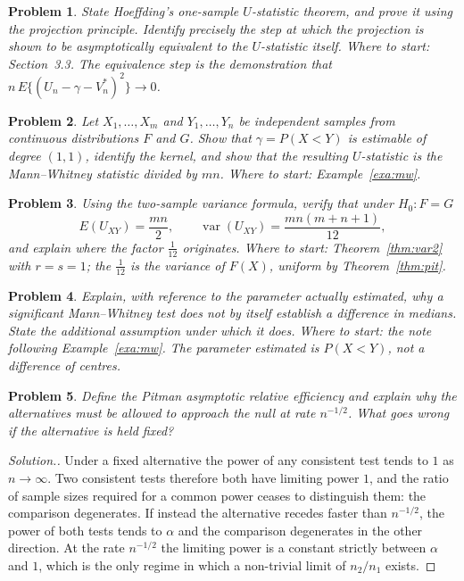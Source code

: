 \documentclass[12pt,a4paper]{report}
\theoremstyle{definition}
\theoremstyle{plain}
\newtheorem{problemx}{Problem}[section]
\newenvironment{problem}{\begin{problemx}}{\end{problemx}}
\newenvironment{solution}
  {\renewcommand{\qedsymbol}{}\begin{proof}[\textit{Solution}.]}
  {\end{proof}}
\begin{document}
\begin{problem}
State Hoeffding's one-sample $U$-statistic theorem, and prove it using the
projection principle. Identify precisely the step at which the projection is
shown to be asymptotically equivalent to the $U$-statistic itself.
\emph{Where to start: Section~3.3. The equivalence step is the demonstration that $n\,E\{(U_n-\gamma-V^*_n)^2\}\to 0$.}
\end{problem}

\begin{problem}
Let $X_1,\dots,X_m$ and $Y_1,\dots,Y_n$ be independent samples from continuous
distributions $F$ and $G$. Show that $\gamma = P(X<Y)$ is estimable of degree
$(1,1)$, identify the kernel, and show that the resulting $U$-statistic is the
Mann--Whitney statistic divided by $mn$.
\emph{Where to start: Example~\ref{exa:mw}.}
\end{problem}

\begin{problem}
Using the two-sample variance formula, verify that under $H_0:F=G$
$$E\left(U_{XY}\right)=\frac{mn}{2},\qquad
\operatorname{var}\left(U_{XY}\right)=\frac{mn(m+n+1)}{12},$$
and explain where the factor $\tfrac{1}{12}$ originates.
\emph{Where to start: Theorem~\ref{thm:var2} with $r=s=1$; the $\tfrac{1}{12}$ is the variance of $F(X)$, uniform by Theorem~\ref{thm:pit}.}
\end{problem}

\begin{problem}
Explain, with reference to the parameter actually estimated, why a significant
Mann--Whitney test does not by itself establish a difference in medians. State
the additional assumption under which it does.
\emph{Where to start: the note following Example~\ref{exa:mw}. The parameter estimated is $P(X<Y)$, not a difference of centres.}
\end{problem}

\begin{problem}
Define the Pitman asymptotic relative efficiency and explain why the
alternatives must be allowed to approach the null at rate $n^{-1/2}$. What goes
wrong if the alternative is held fixed?
\end{problem}

\begin{solution}
Under a fixed alternative the power of any consistent test tends to $1$ as
$n\to\infty$. Two consistent tests therefore both have limiting power $1$, and
the ratio of sample sizes required for a common power ceases to distinguish
them: the comparison degenerates. If instead the alternative recedes faster
than $n^{-1/2}$, the power of both tests tends to $\alpha$ and the comparison
degenerates in the other direction. At the rate $n^{-1/2}$ the limiting power
is a constant strictly between $\alpha$ and $1$, which is the only regime in
which a non-trivial limit of $n_2/n_1$ exists.
\end{solution}
\end{document}

